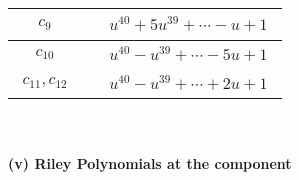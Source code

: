 \documentclass[1p]{elsarticle_modified}
\theoremstyle{definition}
\begin{document}
\begin{tabular}{m{50pt}|m{274pt}}
\hline $$\begin{aligned}c_{9}\end{aligned}$$&$\begin{aligned}
&u^{40}+5 u^{39}+\cdots- u+1
\end{aligned}$\\
\hline $$\begin{aligned}c_{10}\end{aligned}$$&$\begin{aligned}
&u^{40}- u^{39}+\cdots-5 u+1
\end{aligned}$\\
\hline $$\begin{aligned}c_{11},c_{12}\end{aligned}$$&$\begin{aligned}
&u^{40}- u^{39}+\cdots+2 u+1
\end{aligned}$\\
\hline
\end{tabular}\\~\\
\newpage\renewcommand{\arraystretch}{1}
\flushleft \textbf{(v) Riley Polynomials at the component}\newline \\
\end{document}
